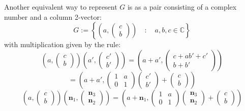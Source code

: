 \documentclass[12pt,twoside,a4paper]{report}
\newcommand{\co}{\ensuremath{\mathbb C }}
\begin{document}
 Another equivalent way to represent $G$ is as a pair consisting of a complex number and a column 2-vector:
 \[
 G:=\left\{\left(a,\begin{pmatrix}c\\b\end{pmatrix}\right) \quad:\quad a, b, c \in\co \right\}
 \]
 with multiplication given by the rule:
  \begin{equation}\left(a,\begin{pmatrix}c\\b\end{pmatrix}\right)
 \left(a',\begin{pmatrix}c'\\b'\end{pmatrix}\right)=\left(a+a',\begin{pmatrix}c+ab'+c'\\b+b'\end{pmatrix}\right)
  \end{equation}
 \[
 =\left(a+a',\begin{pmatrix}1&a\\0&1\end{pmatrix}\begin{pmatrix}c'\\b'\end{pmatrix}+\begin{pmatrix}c\\b\end{pmatrix}\right)
\]
 \begin{equation}\left(a,\begin{pmatrix}c\\b\end{pmatrix}\right)
 \left(\mathbf{n}_1,\begin{pmatrix}\mathbf{n}_3\\\mathbf{n}_2\end{pmatrix}\right)=
 \left(a+\mathbf{n}_1,\begin{pmatrix}1&a\\0&1\end{pmatrix}\begin{pmatrix}\mathbf{n}_3\\\mathbf{n}_2\end{pmatrix}+\begin{pmatrix}c\\b\end{pmatrix}\right)
 \end{equation}
\end{document}

